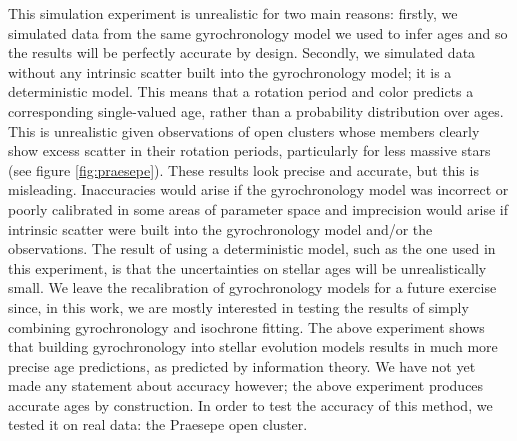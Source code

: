 This simulation experiment is unrealistic for two main reasons: firstly, we
simulated data from the same gyrochronology model we used to infer ages and so
the results will be perfectly accurate by design.
Secondly, we simulated data without any intrinsic scatter built into the
gyrochronology model; it is a deterministic model.
This means that a rotation period and color predicts a corresponding
single-valued age, rather than a probability distribution over ages.
This is unrealistic given observations of open clusters whose members clearly
show excess scatter in their rotation periods, particularly for less massive
stars (see figure \ref{fig:praesepe}).
These results look precise and accurate, but this is misleading.
Inaccuracies would arise if the gyrochronology model was incorrect or poorly
calibrated in some areas of parameter space and imprecision would arise if
intrinsic scatter were built into the gyrochronology model and/or the
observations.
The result of using a deterministic model, such as the one used in this
experiment, is that the uncertainties on stellar ages will be unrealistically
small.
We leave the recalibration of gyrochronology models for a future exercise
since, in this work, we are mostly interested in testing the results of simply
combining gyrochronology and isochrone fitting.
The above experiment shows that building gyrochronology into stellar evolution
models results in much more precise age predictions, as predicted by
information theory.
We have not yet made any statement about accuracy however; the above
experiment produces accurate ages by construction.
In order to test the accuracy of this method, we tested it on real data: the
Praesepe open cluster.

